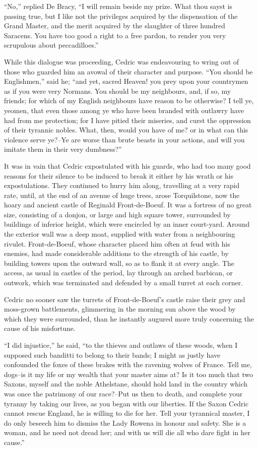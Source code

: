 ``No,'' replied De Bracy, ``I will remain beside my prize. What thou
sayst is passing true, but I like not the privileges acquired by the
dispensation of the Grand Master, and the merit acquired by the
slaughter of three hundred Saracens. You have too good a right to a free
pardon, to render you very scrupulous about peccadilloes.''

While this dialogue was proceeding, Cedric was endeavouring to wring out
of those who guarded him an avowal of their character and purpose. ``You
should be Englishmen,'' said he; ``and yet, sacred Heaven! you prey upon
your countrymen as if you were very Normans. You should be my
neighbours, and, if so, my friends; for which of my English neighbours
have reason to be otherwise? I tell ye, yeomen, that even those among ye
who have been branded with outlawry have had from me protection; for I
have pitied their miseries, and curst the oppression of their tyrannic
nobles. What, then, would you have of me? or in what can this violence
serve ye?--Ye are worse than brute beasts in your actions, and will you
imitate them in their very dumbness?''

It was in vain that Cedric expostulated with his guards, who had too
many good reasons for their silence to be induced to break it either by
his wrath or his expostulations. They continued to hurry him along,
travelling at a very rapid rate, until, at the end of an avenue of huge
trees, arose Torquilstone, now the hoary and ancient castle of Reginald
Front-de-Boeuf. It was a fortress of no great size, consisting of a
donjon, or large and high square tower, surrounded by buildings of
inferior height, which were encircled by an inner court-yard. Around the
exterior wall was a deep moat, supplied with water from a neighbouring
rivulet. Front-de-Boeuf, whose character placed him often at feud with
his enemies, had made considerable additions to the strength of his
castle, by building towers upon the outward wall, so as to flank it at
every angle. The access, as usual in castles of the period, lay through
an arched barbican, or outwork, which was terminated and defended by a
small turret at each corner.

Cedric no sooner saw the turrets of Front-de-Boeuf's castle raise their
grey and moss-grown battlements, glimmering in the morning sun above the
wood by which they were surrounded, than he instantly augured more truly
concerning the cause of his misfortune.

``I did injustice,'' he said, ``to the thieves and outlaws of these
woods, when I supposed such banditti to belong to their bands; I might
as justly have confounded the foxes of these brakes with the ravening
wolves of France. Tell me, dogs--is it my life or my wealth that your
master aims at? Is it too much that two Saxons, myself and the noble
Athelstane, should hold land in the country which was once the patrimony
of our race?--Put us then to death, and complete your tyranny by taking
our lives, as you began with our liberties. If the Saxon Cedric cannot
rescue England, he is willing to die for her. Tell your tyrannical
master, I do only beseech him to dismiss the Lady Rowena in honour and
safety. She is a woman, and he need not dread her; and with us will die
all who dare fight in her cause.''

